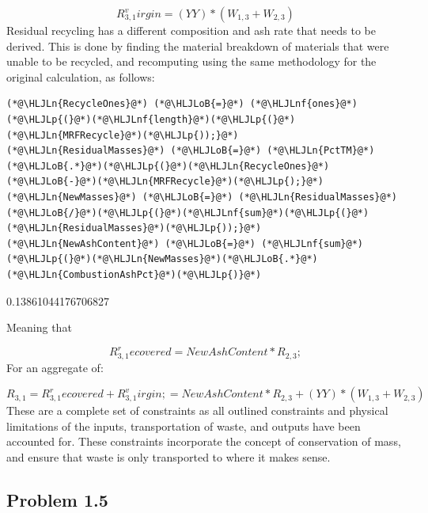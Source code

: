 \documentclass[12pt,a4paper]{article}
\newcommand{\HLJLn}[1]{#1}
\newcommand{\HLJLnf}[1]{\textcolor[RGB]{66,102,213}{#1}}
\newcommand{\HLJLoB}[1]{\textcolor[RGB]{102,102,102}{\textbf{#1}}}
\newcommand{\HLJLp}[1]{#1}
\begin{document}
\[
R_{3,1}^virgin = (YY) * (W_{1,3} + W_{2,3}) 
\]
Residual recycling has a different composition and ash rate that needs to be derived. This is done by finding the  material breakdown of materials that were unable to be recycled, and recomputing using the same methodology for the original calculation, as follows:


\begin{lstlisting}
(*@\HLJLn{RecycleOnes}@*) (*@\HLJLoB{=}@*) (*@\HLJLnf{ones}@*)(*@\HLJLp{(}@*)(*@\HLJLnf{length}@*)(*@\HLJLp{(}@*)(*@\HLJLn{MRFRecycle}@*)(*@\HLJLp{));}@*)
(*@\HLJLn{ResidualMasses}@*) (*@\HLJLoB{=}@*) (*@\HLJLn{PctTM}@*)(*@\HLJLoB{.*}@*)(*@\HLJLp{(}@*)(*@\HLJLn{RecycleOnes}@*)(*@\HLJLoB{-}@*)(*@\HLJLn{MRFRecycle}@*)(*@\HLJLp{);}@*)
(*@\HLJLn{NewMasses}@*) (*@\HLJLoB{=}@*) (*@\HLJLn{ResidualMasses}@*)(*@\HLJLoB{/}@*)(*@\HLJLp{(}@*)(*@\HLJLnf{sum}@*)(*@\HLJLp{(}@*)(*@\HLJLn{ResidualMasses}@*)(*@\HLJLp{));}@*)
(*@\HLJLn{NewAshContent}@*) (*@\HLJLoB{=}@*) (*@\HLJLnf{sum}@*)(*@\HLJLp{(}@*)(*@\HLJLn{NewMasses}@*)(*@\HLJLoB{.*}@*)(*@\HLJLn{CombustionAshPct}@*)(*@\HLJLp{)}@*)
\end{lstlisting}

0.13861044176706827


Meaning that 

\[
R_{3,1}^recovered = NewAshContent*R_{2,3};
\]
For an aggregate of:

\[
R_{3,1} = R_{3,1}^recovered + R_{3,1}^virgin;
=NewAshContent*R_{2,3} + (YY) * (W_{1,3} + W_{2,3}) 
\]
These are a complete set of constraints as all outlined constraints and physical limitations of the inputs, transportation of waste, and outputs have been accounted for. These constraints incorporate the concept of conservation of mass, and ensure that waste is only transported to where it makes sense.

\subsection{Problem 1.5}
\end{document}
